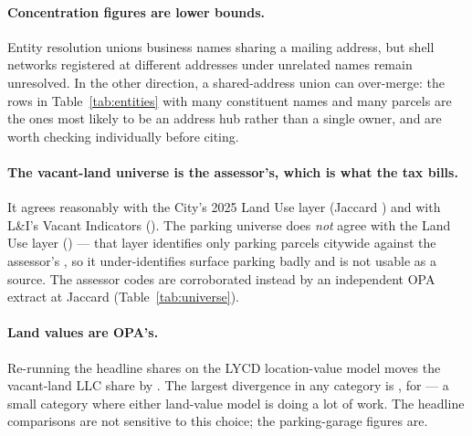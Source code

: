 \documentclass[11pt]{article}
\begin{document}
\paragraph{Concentration figures are lower bounds.} Entity resolution unions business names
sharing a mailing address, but shell networks registered at different addresses under
unrelated names remain unresolved. In the other direction, a shared-address union can
over-merge: the rows in Table~\ref{tab:entities} with many constituent names and many parcels
are the ones most likely to be an address hub rather than a single owner, and are worth
checking individually before citing.

\paragraph{The vacant-land universe is the assessor's, which is what the tax bills.} It
agrees reasonably with the City's 2025 Land Use layer (Jaccard \PhilOwnJaccardVacantLandUse{})
and with L\&I's Vacant Indicators (\PhilOwnJaccardVacantLandI{}). The parking universe does
\emph{not} agree with the Land Use layer (\PhilOwnJaccardParkingLandUse{}) --- that layer
identifies only \PhilOwnCountParkingLandUse{} parking parcels citywide against the assessor's
\PhilOwnParkingOpaCount{}, so it under-identifies surface parking badly and is not usable as
a source. The assessor codes are corroborated instead by an independent OPA extract at
Jaccard \PhilOwnJaccardParkingOpa{} (Table~\ref{tab:universe}).

\paragraph{Land values are OPA's.} Re-running the headline shares on the LYCD
location-value model moves the vacant-land LLC share by \PhilOwnRobustVacantDiffPp{}. The
largest divergence in any category is \PhilOwnRobustMaxDiffPp{}, for
\PhilOwnRobustMaxCategory{} --- a small category where either land-value model is doing a
lot of work. The headline comparisons are not sensitive to this choice; the parking-garage
figures are.

\begin{table}[htbp]
  \centering
  \caption{Classifier precision by predicted owner form, hand-adjudicated.}
  \label{tab:precision}
  \small
  
\end{table}

\begin{table}[htbp]
  \centering
  \caption{Agreement between this study's universes and independent sources.}
  \label{tab:universe}
  \small
  
\end{table}
\end{document}
